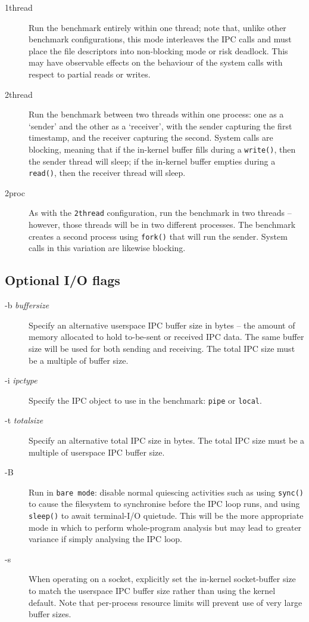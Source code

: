 \documentclass[a4paper,10pt]{article}
\begin{document}
\begin{description}
\item[1thread] Run the benchmark entirely within one thread; note that, unlike
  other benchmark configurations, this mode interleaves the IPC calls and must
  place the file descriptors into non-blocking mode or risk deadlock.
  This may have observable effects on the behaviour of the system calls with
  respect to partial reads or writes.

\item[2thread] Run the benchmark between two threads within one process: one
  as a `sender' and the other as a `receiver', with the sender capturing the
  first timestamp, and the receiver capturing the second.
  System calls are blocking, meaning that if the in-kernel buffer fills
  during a \texttt{write()}, then the sender thread will sleep; if the
  in-kernel buffer empties during a \texttt{read()}, then the receiver thread
  will sleep.


\item[2proc] As with the \texttt{2thread} configuration, run the benchmark in
  two threads -- however, those threads will be in two different processes.
  The benchmark creates a second process using \texttt{fork()} that will run
  the sender.
  System calls in this variation are likewise blocking.
\end{description}

\subsection*{Optional I/O flags}

\begin{description}
\item[-b \textit{buffersize}] Specify an alternative userspace IPC buffer size
  in bytes -- the amount of memory allocated to hold to-be-sent or received
  IPC data.
  The same buffer size will be used for both sending and receiving.
  The total IPC size must be a multiple of buffer size.

\item[-i \textit{ipctype}] Specify the IPC object to use in the benchmark:
  \texttt{pipe} or \texttt{local}.

\item[-t \textit{totalsize}] Specify an alternative total IPC size in bytes.
  The total IPC size must be a multiple of userspace IPC buffer size.

\item[-B] Run in \texttt{bare mode}: disable normal quiescing activities such
  as using \texttt{sync()} to cause the filesystem to synchronise before the
  IPC loop runs, and using \texttt{sleep()} to await terminal-I/O quietude.
  This will be the more appropriate mode in which to perform whole-program
  analysis but may lead to greater variance if simply analysing the IPC loop.

\item[-s] When operating on a socket, explicitly set the in-kernel
  socket-buffer size to match the userspace IPC buffer size rather than using
  the kernel default.
  Note that per-process resource limits will prevent use of very large buffer
  sizes.
\end{description}
\end{document}
